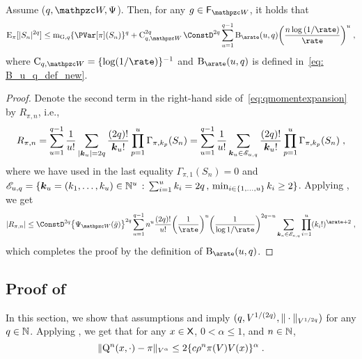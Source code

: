 \begin{lemma}\label{th:generic_th_rosenthal}
Assume ($q,\lyapW,\normlike$). Then, for any $g \in \setfunction_{\lyapW}$, it holds that
\begin{equation*}
\PE_\pi[|S_n|^{2q}] \leq \momentGq[q] \{\PVar[\pi](S_n)\}^q +  \ConstC^{2q}_{q,\lyapW} \ConstD^{2q}  \sum_{u=1}^{q-1} \ConstB_{\arate}(u,q) \biggl(\frac{n \log{(1/\rate)}}{\rate}\biggr)^{u}\eqsp,
\end{equation*}
where $\ConstC_{q,\lyapW}= \{ \log(1/\rate) \}^{-1}$ and $\ConstB_{\arate}(u,q)$ is defined in~\eqref{eq: B_u_q_def_new}.
\end{lemma}
\begin{proof}
Denote the second term in the right-hand side of~\eqref{eq:qmomentexpansion} by $R_{\pi, n}$, i.e.,
\begin{equation*}
    R_{\pi, n} = \sum_{u=1}^{q-1} \frac{1}{u!} \sum_{|\bk_u| = 2q} \frac{(2q)!}{{\boldsymbol k_u}!} \prod_{p=1}^u \Gamma_{\pi, k_p}(S_n) = \sum_{u=1}^{q-1} \frac{1}{u!} \sum_{\bk_u \in \scrE_{u,q}} \frac{(2q)!}{{\boldsymbol k_u}!} \prod_{p=1}^u \Gamma_{\pi, k_p}(S_n) \eqsp,
\end{equation*}
where we have used in the last equality $\Gamma_{\pi,1}(S_n) = 0$ and  $\scrE_{u,q} = \{\bk_u= (k_1,\ldots,k_u) \in \nset^u \, : \, \sum_{i=1}^u k_i = 2q\, ,\, \min_{i \in\iint{1}{u}} k_i \geq 2\}$. Applying , we get
\begin{equation*}
|R_{\pi,n}|  \leq  \ConstD^{2q} \bigl\{\normlike_{\lyapW}(\bar{g})\bigr\}^{2q} \sum_{u=1}^{q-1} n^{u} \frac{(2q)!}{u!}\biggl(\frac{1}{\rate}\biggr)^{u} \biggl(\frac{1}{\log{1/\rate}}\biggr)^{2q-u} \sum_{\boldsymbol{k}_u \in \scrE_{u,q}} \prod_{i=1}^u (k_i!)^{\arate+2}\eqsp,
\end{equation*}
which completes the proof by the definition of $\ConstB_{\arate}(u,q)$.
\end{proof}


\subsection{Proof of }
\label{sec:proof-ros_v_q}
In this section, we show that assumptions  and  imply $(q,V^{1/(2q)},\Vnorm[V^{1/2q}]{\cdot})$ for any $q \in \nset$. Applying , we get that for any $x \in \Xset$, $0 < \alpha  \leq 1$, and $n \in \nset$,
\begin{equation}
\label{eq:V-geometric-better-rate}
\Vnorm[V^\alpha]{\MK^n(x, \cdot) - \pi}
 \leq 2 \{\cmconstv \ratev^n \pi(V)   V(x) \}^{\alpha}
\eqsp.
\end{equation}

